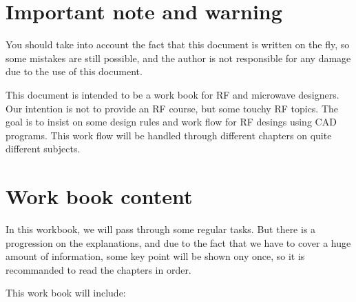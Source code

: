 %
%
%
%


\section*{Important note and warning}

You should take into account the fact that this document is written on
the fly, so some mistakes are still possible, and the author is not
responsible for any damage due to the use of this document.

\bigskip

This document is intended to be a work book for RF and microwave
designers.  Our intention is not to provide an RF course, but some
touchy RF topics.  The goal is to insist on some design rules and work
flow for RF desings using CAD programs.  This work flow will be
handled through different chapters on quite different subjects.

\section*{Work book content}

In this workbook, we will pass through some regular tasks.  But there
is a progression on the explanations, and due to the fact that we have
to cover a huge amount of information, some key point will be shown
ony once, so it is recommanded to read the chapters in order.

\bigskip

This work book will include:

